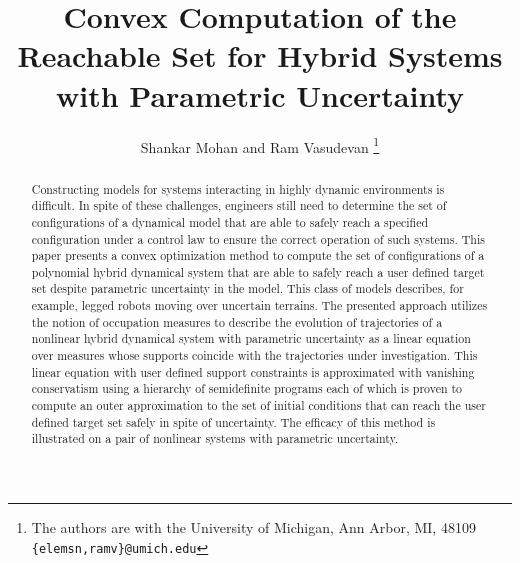 \documentclass[letterpaper]{ieeeconf}
\title{Convex Computation of the Reachable Set for Hybrid Systems with Parametric Uncertainty}
\author{Shankar Mohan and Ram Vasudevan \vspace*{-0.75cm} \thanks{The authors are with the University of Michigan, Ann Arbor, MI, 48109 {\scriptsize \texttt{\{elemsn,ramv\}@umich.edu}}}%
}
\begin{document}
\maketitle
  \begin{abstract}
	Constructing models for systems interacting in highly dynamic environments is difficult.
	In spite of these challenges, engineers still need to determine the set of configurations of a dynamical model that are able to safely reach a specified configuration under a control law to ensure the correct operation of such systems. 
	This paper presents a convex optimization method to compute the set of configurations of a polynomial hybrid dynamical system that are able to safely reach a user defined target set despite parametric uncertainty in the model.
	This class of models describes, for example, legged robots moving over uncertain terrains. 
	The presented approach utilizes the notion of occupation measures to describe the evolution of trajectories of a nonlinear hybrid dynamical system with parametric uncertainty as a linear equation over measures whose supports coincide with the trajectories under investigation. 
	This linear equation with user defined support constraints is approximated with vanishing conservatism using a hierarchy of semidefinite programs each of which is proven to compute an outer approximation to the set of initial conditions that can reach the user defined target set safely in spite of uncertainty. 
	The efficacy of this method is illustrated on a pair of nonlinear systems with parametric uncertainty.
  \end{abstract}
  
  
  
  
  
  


\end{document}
